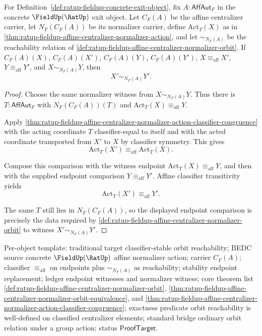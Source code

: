 \begin{theorem}
\label{thm:ratup-fieldup-affine-centralizer-normalizer-orbit-classifier-congruence}
For Definition~\ref{def:ratup-fieldup-concrete-exit-object}, fix
$A:\mathsf{AffAut}_F$ in the concrete $\FieldUp(\RatUp)$ exit object. Let
$C_F(A)$ be the affine centralizer carrier, let $N_F(C_F(A))$ be its normalizer
carrier, define $\mathrm{Act}_T(X)$ as in
\autoref{thm:ratup-fieldup-affine-centralizer-normalizer-action}, and let
$\sim_{N_F(A)}$ be the reachability relation of
\autoref{def:ratup-fieldup-affine-centralizer-normalizer-orbit}. If
$C_F(A)(X)$, $C_F(A)(X')$, $C_F(A)(Y)$, $C_F(A)(Y')$,
$X\equiv_{\mathrm{aff}}X'$, $Y\equiv_{\mathrm{aff}}Y'$, and
$X\sim_{N_F(A)}Y$, then
$$
X'\sim_{N_F(A)}Y'.
$$
\end{theorem}
\begin{proof}
Choose the same normalizer witness from $X\sim_{N_F(A)}Y$. Thus there is
$T:\mathsf{AffAut}_F$ with $N_F(C_F(A))(T)$ and
$\mathrm{Act}_T(X)\equiv_{\mathrm{aff}}Y$.

Apply
\autoref{thm:ratup-fieldup-affine-centralizer-normalizer-action-classifier-congruence}
with the acting coordinate $T$ classifier-equal to itself and with the acted
coordinate transported from $X'$ to $X$ by classifier symmetry. This gives
$$
\mathrm{Act}_T(X')\equiv_{\mathrm{aff}}\mathrm{Act}_T(X).
$$

Compose this comparison with the witness endpoint
$\mathrm{Act}_T(X)\equiv_{\mathrm{aff}}Y$, and then with the supplied endpoint
comparison $Y\equiv_{\mathrm{aff}}Y'$. Affine classifier transitivity yields
$$
\mathrm{Act}_T(X')\equiv_{\mathrm{aff}}Y'.
$$

The same $T$ still lies in $N_F(C_F(A))$, so the displayed endpoint comparison
is precisely the data required by
\autoref{def:ratup-fieldup-affine-centralizer-normalizer-orbit} to witness
$X'\sim_{N_F(A)}Y'$.
\end{proof}

Per-object template: traditional target classifier-stable orbit reachability;
BEDC source concrete $\FieldUp(\RatUp)$ affine normalizer action; carrier
$C_F(A)$; classifier $\equiv_{\mathrm{aff}}$ on endpoints plus
$\sim_{N_F(A)}$ as reachability; stability endpoint replacement; ledger endpoint
witnesses and normalizer witness; core theorem list
\autoref{def:ratup-fieldup-affine-centralizer-normalizer-orbit},
\autoref{thm:ratup-fieldup-affine-centralizer-normalizer-orbit-equivalence}, and
\autoref{thm:ratup-fieldup-affine-centralizer-normalizer-action-classifier-congruence};
exactness predicate orbit reachability is well-defined on classified centralizer
elements; standard bridge ordinary orbit relation under a group action; status
$\mathsf{ProofTarget}$.
